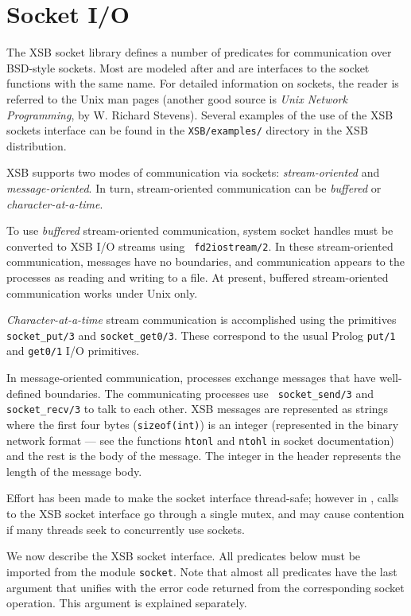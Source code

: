\section{Socket I/O}

The XSB socket library defines a number of predicates for
communication over BSD-style sockets. Most are modeled after and are
interfaces to the socket functions with the same name. For detailed
information on sockets, the reader is referred to the Unix man pages
(another good source is \emph{Unix Network Programming}, by W.
Richard Stevens).  Several examples of the use of the XSB sockets
interface can be found in the {\tt XSB/examples/} directory in the XSB
distribution.

XSB supports two modes of communication via sockets:
\emph{stream-oriented} and \emph{message-oriented}. In turn,
stream-oriented communication can be \emph{buffered} or
\emph{character-at-a-time}.

To use \emph{buffered} stream-oriented communication, system socket
handles must be converted to XSB I/O streams using {\tt
  fd2iostream/2}.  In these stream-oriented communication, messages
have no boundaries, and communication appears to the processes as
reading and writing to a file.  At present, buffered stream-oriented
communication works under Unix only.

\emph{Character-at-a-time} stream communication is accomplished using
the primitives {\tt socket\_put/3} and {\tt socket\_get0/3}. These
correspond to the usual Prolog {\tt put/1} and {\tt get0/1} I/O primitives.

In message-oriented communication, processes exchange messages that have
well-defined boundaries. The communicating processes use {\tt
  socket\_send/3} and {\tt socket\_recv/3} to talk to each other.
XSB messages are represented as strings where the first four bytes
({\tt sizeof(int)}) is an integer (represented in the binary network format
--- see the functions {\tt htonl} and {\tt ntohl} in socket documentation)
and the rest is the body of the message. The integer in the header
represents the length of the message body.

Effort has been made to make the socket interface thread-safe; however
in \version, calls to the XSB socket interface go through a single
mutex, and may cause contention if many threads seek to concurrently
use sockets.

We now describe the XSB socket interface.  All predicates below must be
imported from the module {\tt socket}. Note that almost all predicates have
the last argument that unifies with the error code returned from the
corresponding socket operation. This argument is explained separately.


